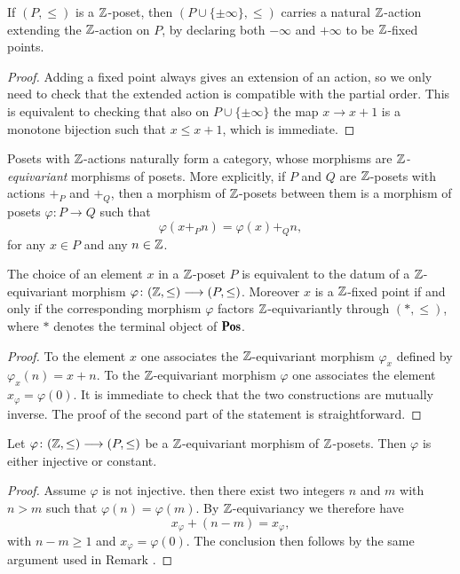 \begin{lemma}
 If $(P,\leq)$ is a $\mathbb{Z}$-poset, then $(P\cup\{\pm\infty\},\leq)$ carries a natural $\mathbb{Z}$-action extending the $\mathbb{Z}$-action on $P$, by declaring both $-\infty$ and $+\infty$ to be $\mathbb{Z}$-fixed points.
\end{lemma}
\begin{proof}
 Adding a fixed point always gives an extension of an action, so we only need to check that the extended action is compatible with the partial order. This is equivalent to checking that also on $P\cup\{\pm\infty\}$ the map $x\to x+1$ is a monotone bijection such that $x\leq x+1$, which is immediate. 
\end{proof}
Posets with $\mathbb{Z}$-actions naturally form a category, whose morphisms are \emph{$\mathbb{Z}$-equivariant} morphisms of posets. More explicitly, if $P$ and $Q$ are $\mathbb{Z}$-posets with actions $+_P$ and $+_Q$, then a morphism of $\mathbb{Z}$-posets between them is a morphism of posets $\varphi\colon P\to Q$ such that
\[
\varphi(x+_P n)=\varphi(x)+_Q n,
\]
for any $x\in P$ and any $n\in \mathbb{Z}$.
\begin{lemma}\label{trivial.but.useful2}
The choice of an element $x$ in a $\mathbb{Z}$-poset $P$ is equivalent to the datum of a $\mathbb{Z}$-equivariant morphism $\varphi\colon(\mathbb{Z} ,\leq)\longrightarrow (P,\leq)$. Moreover $x$ is a $\mathbb{Z}$-fixed point if and only if the corresponding morphism $\varphi$ factors $\mathbb{Z}$-equivariantly through $(*,\leq)$, where $*$ denotes the terminal object of $\cate{Pos}$. 
 \end{lemma}
\begin{proof}
To the element $x$ one associates the $\mathbb{Z}$-equivariant morphism $\varphi_x$ defined by $\varphi_x(n)=x+n$. To the $\mathbb{Z}$-equivariant morphism $\varphi$ one associates the element $x_\varphi=\varphi(0)$. It is immediate to check that the two constructions are mutually inverse. The proof of the second part of the statement is straightforward.
\end{proof}
\begin{lemma}
Let $\varphi\colon(\mathbb{Z} ,\leq)\longrightarrow (P,\leq)$ be a $\mathbb{Z}$-equivariant morphism of $\mathbb{Z}$-posets. Then $\varphi$ is either injective or constant.
\end{lemma}
\begin{proof}
Assume $\varphi$ is not injective. then there exist two integers $n$ and $m$ with $n>m$ such that $\varphi(n)=\varphi(m)$. By $\mathbb{Z}$-equivariancy we therefore have
\[
x_\varphi+(n-m)=x_\varphi,
\]
with $n-m\geq 1$ and $x_\varphi=\varphi(0)$. The conclusion then follows by the same argument used in Remark .
\end{proof}
